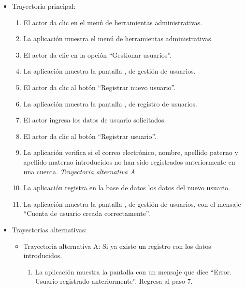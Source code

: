			\begin{itemize}
				\item Trayectoria principal:
					\begin{enumerate}
						\item El actor da clic en el menú de herramientas administrativas.
						\item La aplicación muestra el menú de herramientas administrativas.
						\item El actor da clic en la opción ``Gestionar usuarios''.
						\item La aplicación muestra la pantalla , de gestión de usuarios.
						\item El actor da clic al botón ``Registrar nuevo usuario''.
						\item La aplicación muestra la pantalla , de registro de usuarios.
						\item El actor ingresa los datos de usuario solicitados.
						\item El actor da clic al botón ``Registrar usuario''.
						\item La aplicación verifica si el correo electrónico, nombre, apellido paterno y apellido materno introducidos no han sido registrados anteriormente en una cuenta. \textsl{Trayectoria alternativa A}
						\item La aplicación registra en la base de datos los datos del nuevo usuario.
						\item La aplicación muestra la pantalla , de gestión de usuarios, con el mensaje ``Cuenta de usuario creada correctamente''.
					\end{enumerate}
				\item Trayectorias alternativas:
					\begin{itemize}
						\item Trayectoria alternativa A: Si ya existe un registro con los datos introducidos.
							\begin{enumerate}
								\item La aplicación muestra la pantalla  con un mensaje que dice ``Error. Usuario registrado anteriormente''. Regresa al paso 7.
							\end{enumerate}
					\end{itemize}
			\end{itemize}
			
